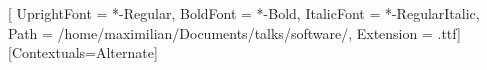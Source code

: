 \usepackage{fontspec}

\newfontfamily{}[
    UprightFont = *-Regular,
    BoldFont = *-Bold,
    ItalicFont = *-RegularItalic,
    Path = /home/maximilian/Documents/talks/software/,
    Extension = .ttf]
\newfontface{}
\newfontface{}
\newfontface{}
\setmonofont{JuliaMono-Medium}[Contextuals=Alternate]

